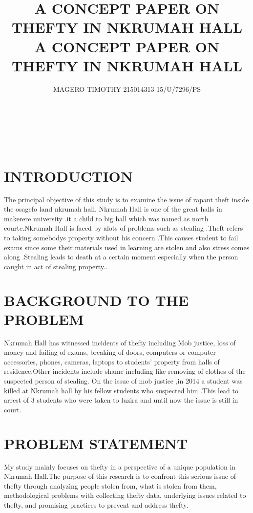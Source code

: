 \documentclass[10pt]{article}
\title{
	{A CONCEPT PAPER ON THEFTY IN NKRUMAH HALL}\\
}
\author{
{MAGERO TIMOTHY 215014313   15/U/7296/PS}
}
\begin{document}
\title{	{A CONCEPT PAPER ON THEFTY IN NKRUMAH HALL}\\}
\maketitle

\

\

\section{INTRODUCTION}
{The principal objective of this study is to examine the issue of rapant theft inside the osagefo land nkrumah hall. Nkrumah Hall is one of the great halls in makerere university .it a child to big hall which was named as north courte.Nkrumah Hall is faced by alots of problems such as stealing .Theft refers to taking somebodys property without his concern .This causes student to fail exams since some their materials used in learning are stolen and also stress comes along .Stealing leads to death at a certain moment especially when the person caught in act of stealing property..}
\section{BACKGROUND TO THE PROBLEM}
{Nkrumah Hall has witnessed incidents of thefty including Mob justice, loss of money and failing of exams, breaking of doors, computers or computer accessories, phones, cameras, laptops to students’ property from halls of residence.Other incidents include shame including like removing of clothes of the suspected person of stealing. On the issue of mob justice ,in 2014 a student was killed at Nkrumah hall by his fellow students who suspected him .This lead to arrest of 3 students who were taken to luzira and until now the issue is still in court.
}
\section{PROBLEM STATEMENT}
{My study mainly focuses on thefty in a perspective of a unique population in Nkrumah Hall.The purpose of this research is to confront this serious  issue of thefty through analyzing people stolen from, what is stolen from them, methodological problems with collecting thefty data, underlying issues related to thefty, and promising practices to prevent and address thefty.
}
\end{document}
